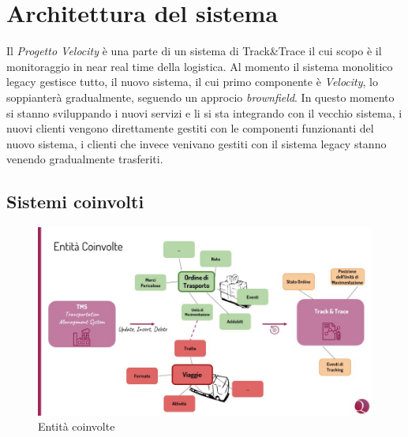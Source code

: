 \chapter{Architettura del sistema}
\label{ch:architecture}
Il \textit{Progetto Velocity} è una parte di un sistema di Track\&Trace il cui scopo è il monitoraggio in near real time della logistica.
Al momento il sistema monolitico legacy gestisce tutto, il nuovo sistema, il cui primo componente è \textit{Velocity}, lo soppianterà gradualmente, seguendo un approcio \textit{brownfield}.
In questo momento si stanno sviluppando i nuovi servizi e li si sta integrando con il vecchio sistema, i nuovi clienti vengono direttamente gestiti con le componenti
funzionanti del nuovo sistema, i clienti che invece venivano gestiti con il sistema legacy stanno venendo gradualmente trasferiti.

\section{Sistemi coinvolti}
\label{sec:architecture_entity}

\begin{figure}[H]
\centering
    \includegraphics[width=\textwidth]{images/architecture/entita_coinvolte.jpg}
    \caption{Entità coinvolte}
    \label{fig:architecture_entities_img}
\end{figure}

